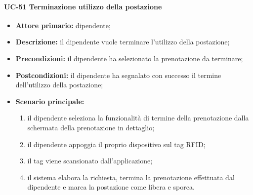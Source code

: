 \paragraph{UC-51 Terminazione utilizzo della postazione}

    \begin{itemize}
        \item \textbf{Attore primario:} dipendente;

        \item \textbf{Descrizione:} il dipendente vuole terminare l'utilizzo della postazione;

        \item \textbf{Precondizioni:} il dipendente ha selezionato la prenotazione da terminare;

        \item \textbf{Postcondizioni:} il dipendente ha segnalato con successo il termine dell'utilizzo della postazione;

        \item \textbf{Scenario principale:}
            \begin{enumerate}
                \item il dipendente seleziona la funzionalità di termine della prenotazione dalla schermata della prenotazione in dettaglio;
                \item il dipendente appoggia il proprio dispositivo sul tag RFID;
                \item il tag viene scansionato dall'applicazione;
                \item il sistema elabora la richiesta, termina la prenotazione effettuata dal dipendente e marca la postazione come libera e sporca.
            \end{enumerate}
    \end{itemize} 

